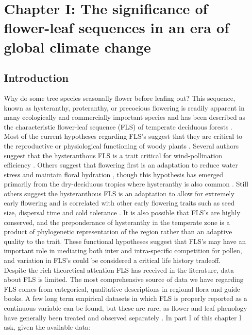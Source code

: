 \documentclass[12pt]{article}\usepackage[]{graphicx}\usepackage[]{color}
\begin{document}
\section*{Chapter I: The significance of flower-leaf sequences in an era of global climate change}
\subsection*{Introduction}
\indent\indent Why do some tree species seasonally flower before leafing out? This sequence, known as hysteranthy, proteranthy, or precocious flowering is readily apparent in many ecologically and commercially important species and has been described as  the characteristic flower-leaf sequence (FLS) of temperate deciduous forests \citep{Rathcke1985}. Most of the current hypotheses regarding FLS's suggest that they are critical to the reproductive or physiological functioning of woody plants \citep{Gougherty2018}. Several authors suggest that the hysteranthous FLS is a trait critical for wind-pollination efficiency \citep{Whitehead1969,Friedman2009}. Others suggest that flowering first is an adaptation to reduce water stress and maintain floral hydration \citep{Franklin2016}, though this hypothesis has emerged primarily from the dry-deciduous tropics where hysteranthy is also common \citep{Janzen1967,Franklin2016}.  Still others suggest the hysteranthous FLS is an adaptation to allow for extremely early flowering and is correlated with other early flowering traits such as seed size, dispersal time and cold tolerance \citep{Gougherty2018,Bolmgren2003,Primack1987}. It is also possible that FLS's are highly conserved, and the preponderance of hysteranthy in the temperate zone is a product of phylogenetic representation of the region rather than an adaptive quality to the trait. These functional hypotheses suggest that FLS's may have an important role in mediating both inter and intra-specific competition for pollen, and variation in FLS's could be considered a critical life history tradeoff. \\
\indent Despite the rich theoretical attention FLS has received in the literature, data about FLS is limited. The most comprehensive source of data we have regarding FLS comes from categorical, qualitative descriptions in regional flora and guide books. A few long term empirical datasets in which FLS is properly reported as a continuous variable can be found, but these are rare, as flower and leaf phenology have generally been treated and observed separately \citep{Wolkovich2014}. In part I of this chapter I ask, given the available data:
\end{document}
